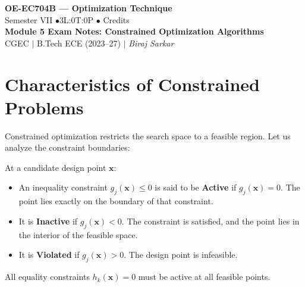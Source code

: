 \documentclass[12pt,a4paper]{article}
\begin{document}

\begin{center}
  {\LARGE\bfseries\color{myred} OE-EC704B --- Optimization Technique}\\[5pt]
  {\normalsize\color{mydark} Semester VII \quad$\bullet$\quad 3L:0T:0P \quad$\bullet$ Credits}\\[3pt]
  {\normalsize\color{myteal}\textbf{Module 5 Exam Notes: Constrained Optimization Algorithms}}\\[3pt]
  {\small\color{mydark} CGEC \;$|$\; B.Tech ECE (2023--27) \;$|$\; \textit{Biraj Sarkar}}
\end{center}
\vspace{2pt}
\noindent{\color{myred}\rule{\linewidth}{1.5pt}}
\vspace{2pt}

\hypersetup{linkcolor=mydark}
\tableofcontents
\hypersetup{linkcolor=myteal}
\newpage

\section{Characteristics of Constrained Problems}

Constrained optimization restricts the search space to a feasible region. Let us analyze the constraint boundaries:

\begin{tcolorbox}[defbox, title={Active vs. Inactive Constraints}]
At a candidate design point $\mathbf{x}$:
\begin{itemize}[leftmargin=*, itemsep=2.5pt, topsep=0pt]
  \item An inequality constraint $g_j(\mathbf{x}) \le 0$ is said to be \textbf{Active} if $g_j(\mathbf{x}) = 0$. The point lies exactly on the boundary of that constraint.
  \item It is \textbf{Inactive} if $g_j(\mathbf{x}) < 0$. The constraint is satisfied, and the point lies in the interior of the feasible space.
  \item It is \textbf{Violated} if $g_j(\mathbf{x}) > 0$. The design point is infeasible.
\end{itemize}
All equality constraints $h_k(\mathbf{x}) = 0$ must be active at all feasible points.
\end{tcolorbox}
\end{document}
